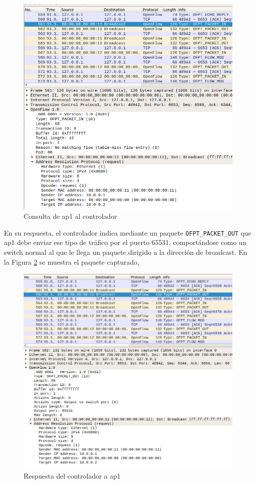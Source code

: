 \documentclass[a4paper,12pt,twoside,spanish]{book}
\begin{document}
	\begin{figure}[!h]
		\centering
		\includegraphics[scale=0.4]{Figuras/capt_1.png}
		\caption{Consulta de ap1 al controlador}
		\label{fig:capt_1}
	\end{figure}

En su respuesta, el controlador indica mediante un paquete \texttt{OFPT\_PACKET\_OUT} que ap1 debe enviar ese tipo de tráfico por el puerto 65531, comportándose como un switch normal al que le llega un paquete dirigido a la dirección de broadcast. En la Figura \ref{fig:capt_2} se muestra el paquete capturado,\par

	\begin{figure}[!h]
		\centering
		\includegraphics[scale=0.4]{Figuras/capt_2.png}
		\caption{Respuesta del controlador a ap1}
		\label{fig:capt_2}
	\end{figure}
\end{document}
